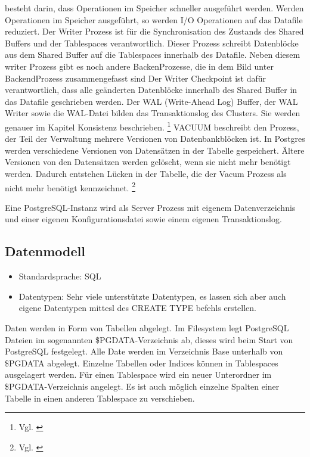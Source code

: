     besteht darin, dass Operationen im Speicher schneller ausgeführt werden. Werden Operationen im Speicher ausgeführt, so werden I/O Operationen auf das Datafile reduziert. Der Writer Prozess ist für die Synchronisation
    des Zustands des Shared Buffers und der Tablespaces verantwortlich. Dieser Prozess schreibt Datenblöcke aus dem Shared Buffer auf die Tablespaces innerhalb des Datafile. Neben diesem writer Prozess gibt es noch andere BackenProzesse, die in dem Bild unter BackendProzess zusammengefasst sind
    Der Writer Checkpoint ist dafür verantwortlich, dass alle geänderten Datenblöcke innerhalb des Shared Buffer in das Datafile geschrieben werden. Der WAL (Write-Ahead Log) Buffer, der WAL Writer sowie die WAL-Datei bilden das Transaktionslog des Clusters. Sie werden genauer im Kapitel Konsistenz beschrieben.
    \footnote{Vgl. \cite[Seite 26]{froehlich01}} VACUUM beschreibt den Prozess, der Teil der Verwaltung mehrere Versionen
    von Datenbankblöcken ist. In Postgres werden verschiedene Versionen von Datensätzen in der Tabelle gespeichert. Ältere Versionen von den Datensätzen werden gelöscht, wenn sie nicht mehr benötigt werden. Dadurch entstehen
    Lücken in der Tabelle, die der Vacum Prozess als nicht mehr benötigt kennzeichnet. \footnote{Vgl. \cite[Seite 37]{froehlich01}}

    Eine PostgreSQL-Instanz wird als Server Prozess mit eigenem Datenverzeichnis und einer eigenen Konfigurationsdatei sowie einem eigenen Transaktionslog.
\subsection{Datenmodell}
    \begin{itemize}
        \item Standardsprache: SQL
        \item Datentypen:
        \subitem Sehr viele unterstützte Datentypen, es lassen sich aber auch eigene Datentypen mittesl des CREATE TYPE befehls erstellen.\cite{postgres8}
    \end{itemize}
    Daten werden in Form von Tabellen abgelegt. Im Filesystem legt PostgreSQL Dateien im sogenannten \$PGDATA-Verzeichnis ab, dieses wird beim Start von PostgreSQL festgelegt. Alle Date werden im Verzeichnis Base unterhalb von \$PGDATA abgelegt. Einzelne Tabellen oder Indices können in Tablespaces ausgelagert werden. Für einen Tablespace wird ein neuer Unterordner im \$PGDATA-Verzeichnis angelegt. Es ist auch möglich einzelne Spalten einer Tabelle in einen anderen Tablespace zu verschieben.
